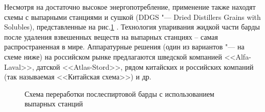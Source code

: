 Несмотря на достаточно высокое энергопотребление, применение также находят схемы с выпарными станциями и сушкой (DDGS "--- Dried Distillers Grains with Solubles), представленные на рис.\ref{ShemaDDGS} \cite{web_distil}. 
Технология упаривания жидкой части барды после удаления взвешенных веществ на выпарных станциях -- самая распространенная в мире. 
Аппаратурные решения (один из вариантов "--- на схеме ниже) на российском рынке предлагаются шведской компанией <<Alfa-Laval>>, датской <<Atlas-Stord>>, рядом китайских и российских компаний (так называемая <<Китайская схема>>) и др. 

\begin{figure} 
\centering 
\begin{small} 
\def\svgwidth{0.8\linewidth}
 
\end{small} 
\caption{Схема переработки послеспиртовой барды с использованием выпарных станций} 
\label{ShemaDDGS} 
\end{figure}
 
